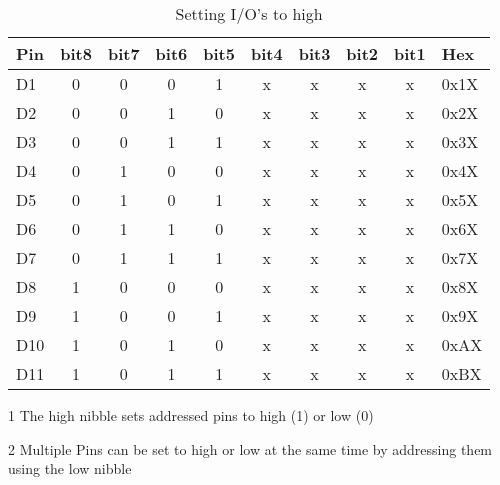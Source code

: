\documentclass[10pt]{datasheet}
\begin{document}
\begin{table}[h]
\begin{threeparttable}
\caption{Setting I/O's to high}
\label{table:Pin_state_map}
\begin{tabularx}{\textwidth}{l | c | c | c | c | c | c | c | c | X}
    \thickhline
    \textbf{Pin}	& \textbf{bit8}	& \textbf{bit7}	& \textbf{bit6}	& \textbf{bit5}	& \textbf{bit4}	& \textbf{bit3}	& \textbf{bit2}	& \textbf{bit1} 	& \textbf{Hex} \\
    \hline
    D1	&	0	&	0	&	0	&	1	&	x	&	x	&	x	&	x	&0x1X \\
	\hline
    D2	&	0	&	0	&	1	&	0	& 	x	&	x	&	x	&	x	&0x2X \\
	\hline
    D3	&	0	&	0	&	1	&	1	& 	x	&	x	&	x	&	x	&0x3X \\
	\hline
    D4	&	0	&	1	&	0	&	0	& 	x	&	x	&	x	&	x	&0x4X \\
	\hline
    D5	&	0	&	1	&	0	&	1	& 	x	&	x	&	x	&	x	&0x5X \\
	\hline
    D6	&	0	&	1	&	1	&	0	& 	x	&	x	&	x	&	x	&0x6X \\
	\hline
    D7	&	0	&	1	&	1	&	1	& 	x	&	x	&	x	&	x	&0x7X \\
	\hline
    D8	&	1	&	0	&	0	&	0	& 	x	&	x	&	x	&	x	&0x8X \\
	\hline
    D9	&	1	&	0	&	0	&	1	& 	x	&	x	&	x	&	x	&0x9X \\
	\hline
    D10	&	1	&	0	&	1	&	0	& 	x	&	x	&	x	&	x	&0xAX \\
	\hline
    D11	&	1	&	0	&	1	&	1	& 	x	&	x	&	x	&	x	&0xBX \\
\end{tabularx}
\begin{tablenotes}
\item[1]{The high nibble sets addressed pins to high (1) or low (0)}
\item[2]{Multiple Pins can be set to high or low at the same time by addressing them using the low nibble}
\end{tablenotes}
\end{threeparttable}
\end{table}
\end{document}
